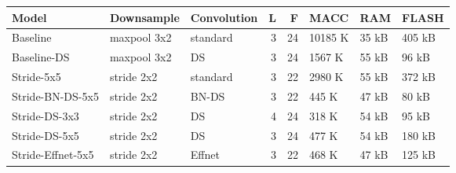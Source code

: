 \begin{tabular}{lllrrlll}
\toprule
             Model &   Downsample & Convolution &  L &   F &     MACC &    RAM &   FLASH \\
\midrule
          Baseline &  maxpool 3x2 &    standard &  3 &  24 &  10185 K &  35 kB &  405 kB \\
       Baseline-DS &  maxpool 3x2 &          DS &  3 &  24 &   1567 K &  55 kB &   96 kB \\
        Stride-5x5 &   stride 2x2 &    standard &  3 &  22 &   2980 K &  55 kB &  372 kB \\
  Stride-BN-DS-5x5 &   stride 2x2 &       BN-DS &  3 &  22 &    445 K &  47 kB &   80 kB \\
     Stride-DS-3x3 &   stride 2x2 &          DS &  4 &  24 &    318 K &  54 kB &   95 kB \\
     Stride-DS-5x5 &   stride 2x2 &          DS &  3 &  24 &    477 K &  54 kB &  180 kB \\
 Stride-Effnet-5x5 &   stride 2x2 &      Effnet &  3 &  22 &    468 K &  47 kB &  125 kB \\
\bottomrule
\end{tabular}

